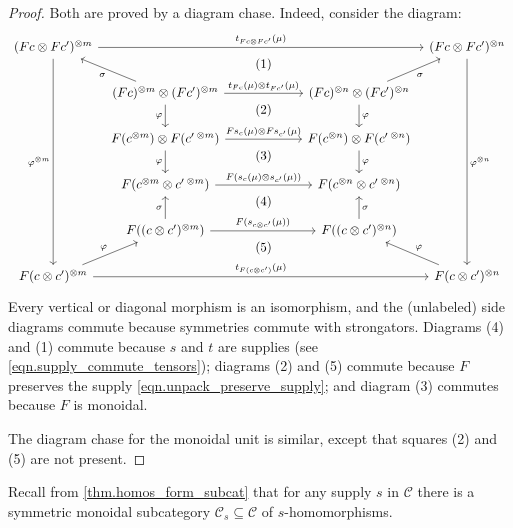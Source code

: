 \documentclass[11pt, oneside, article]{memoir}
\theoremstyle{plain}
\theoremstyle{definition}
\theoremstyle{remark}
\newcommand{\cat}[1]{\mathcal{#1}}%
\newcommand{\tpow}[1]{^{\otimes #1}}
\renewcommand{\ss}{\subseteq}
\begin{document}
\begin{proof}
Both are proved by a diagram chase. Indeed, consider the diagram:
\[
\begin{tikzcd}[column sep=6pt]
	(Fc\otimes Fc')\tpow{m}
		\ar[rrrr, "t_{Fc\otimes Fc'}(\mu)"]
		\ar[ddddd, "\varphi\tpow{m}"']
		\ar[from=dr, "\sigma"]&&[18pt]
		\ar[d, phantom, near start,  "(1)"]&[18pt]&
	(Fc\otimes Fc')\tpow{n}
		\ar[ddddd, "\varphi\tpow{n}"]
		\ar[from=dl, "\sigma"']\\&
	(Fc)\tpow{m}\otimes(Fc')\tpow{m}
		\ar[d, "\varphi"']
		\ar[rr, "t_{Fc}(\mu)\otimes t_{Fc'}(\mu)"]&
		\ar[d, phantom, near start, "(2)"]&
	(Fc)\tpow{n}\otimes(Fc')\tpow{n}
		\ar[d, "\varphi"]\\&
	F(c\tpow{m})\otimes F(c'\,\tpow{m})
		\ar[rr, "Fs_c(\mu)\otimes Fs_{c'}(\mu)"]
		\ar[d, "\varphi"']&
		\ar[d, phantom, near start, "(3)"]&
	F(c\tpow{n})\otimes F(c'\,\tpow{n})
		\ar[d, "\varphi"]\\&
	F(c\tpow{m}\otimes c'\,\tpow{m})
		\ar[rr, "F(s_c(\mu)\otimes s_{c'}(\mu))"]&
		\ar[d, phantom, near start, "(4)"]&
	F(c\tpow{n}\otimes c'\,\tpow{n})\\&
	F((c\otimes c')\tpow{m})
		\ar[u, "\sigma"]
		\ar[rr, "F(s_{c\otimes c'}(\mu))"]&
		\ar[d, phantom, near start, "(5)"]&
	F((c\otimes c')\tpow{n})
		\ar[u, "\sigma"']\\
	F(c\otimes c')\tpow{m}
		\ar[rrrr, "t_{F(c\otimes c')}(\mu)"]
		\ar[ur, "\varphi"]&&~&&
	F(c\otimes c')\tpow{n}
		\ar[ul, "\varphi"']
\end{tikzcd}
\]
Every vertical or diagonal morphism is an isomorphism, and the (unlabeled) side diagrams commute because symmetries commute with strongators. Diagrams (4) and (1) commute because $s$ and $t$ are supplies (see \cref{eqn.supply_commute_tensors}); diagrams (2) and (5) commute because $F$ preserves the supply \eqref{eqn.unpack_preserve_supply}; and diagram (3) commutes because $F$ is monoidal.

The diagram chase for the monoidal unit is similar, except that squares (2) and (5) are not present.
\end{proof}

Recall from \cref{thm.homos_form_subcat} that for any supply $s$ in $\cat{C}$ there is a symmetric monoidal subcategory $\cat{C}_s\ss\cat{C}$ of $s$-homomorphisms.
\end{document}
